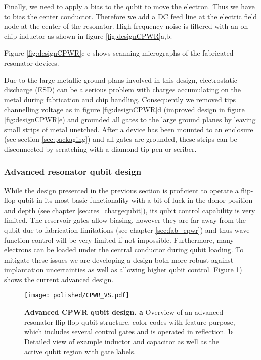  Finally, we need to apply a bias to the qubit to move the electron. Thus we have to bias the center conductor. Therefore we add a DC feed line at the electric field node at the center of the resonator. High frequency noise is filtered with an on-chip inductor as shown in figure \ref{fig:designCPWR}a,b. 
 
Figure \ref{fig:designCPWR}c-e shows scanning micrographs of the fabricated resonator devices. 

Due to the large metallic ground plans involved in this design, electrostatic discharge (ESD) can be a serious problem with charges accumulating on the metal during fabrication and chip handling. Consequently we removed tips channelling voltage as in figure \ref{fig:designCPWR}d (improved design in figure \ref{fig:designCPWR}e) and grounded all gates to the large ground planes by leaving small strips of metal unetched. After a device has been mounted to an enclosure (see section \ref{sec:packaging}) and all gates are grounded, these strips can be disconnected by scratching with a diamond-tip pen or scriber. 

\subsubsection*{Advanced resonator qubit design} \label{sec:adv_res_design}

While the design presented in the previous section is proficient to operate a flip-flop qubit in its most basic functionality with a bit of luck in the donor position and depth (see chapter \ref{sec:res_chargequbit}), its qubit control capability is very limited. The reservoir gates allow biasing, however they are far away from the qubit due to fabrication limitations (see chapter \ref{sec:fab_cpwr}) and thus wave function control will be very limited if not impossible. Furthermore, many electrons can be loaded under the central conductor during qubit loading. 
To mitigate these issues we are developing a design both more robust against implantation uncertainties as well as allowing higher qubit control. Figure  \ref{fig:designCPWR_new}) shows the current advanced design.  

\begin{figure}
	\centering
	\texttt{[image: polished/CPWR\_VS.pdf]}
	\caption[Advanced CPWR qubit design]{\textbf{Advanced CPWR qubit design. a} Overview of an advanced resonator flip-flop qubit structure, color-codes with feature purpose, which includes several control gates and is operated in reflection. \textbf{b} Detailed view of example inductor and capacitor as well as the active qubit region with gate labels.   }
	\label{fig:designCPWR_new}
\end{figure}


